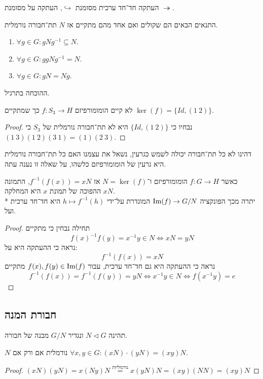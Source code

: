 \begin{notation}
	העתקה חד־חד ערכית מסומנת $\hookrightarrow$,
	העתקה על מסומנת $\twoheadrightarrow$.
\end{notation}
\begin{proposition}
	התנאים הבאים הם שקולים ואם אחד מהם מתקיים אז $N$ תת־חבורה נורמלית.
	\begin{enumerate}
		\item $\forall g \in G : g N g^{-1} \subseteq N$.
		\item $\forall g \in G : g g N g^{-1} = N$.
		\item $\forall g \in G : g N = N g$.
	\end{enumerate}
	ההוכחה בתרגיל.
\end{proposition}
\begin{conclusion}
	לא קיים הומומורפיזם $f : S_3 \to H$ כך שמתקיים $\ker(f) = \{ Id, (1\ 2) \}$.
\end{conclusion}
\begin{proof}
	נבחיו כי $\{ Id, (1\ 2)\}$ היא לא תת־חבורה נורמלית של $S_3$ כי $(1\ 3)(1\ 2)(3\ 1) = (1)(2\ 3)$.
\end{proof}
דהינו לא כל תת־חבורה יכולה לשמש כגרעין, נשאל את עצמנו האם כל תת־חבורה נורמלית היא גרעין של הומומורפיזם כלשהו, על שאלה זו נענה עתה.

\begin{proposition}
	כאשר $f : G \to H$ הומומורפיזם ו־$N = \ker(f)$ אז $f^{-1}(f(x)) = x N$, התמונה ההפוכה של תמונת $x$ היא המחלקה $x N$. \\*
	יתרה מכך הפונקציה $\operatorname{Im}(f) \to G/N$ המוגדרת על־ידי $h \mapsto f^{-1}(h)$ היא חד־חד ערכית ועל.
\end{proposition}
\begin{proof}
	תחילה נבחין כי מתקיים
	\[
		{f(x)}^{-1} f(y) = x^{-1} y \in N \iff xN = yN
	\]
	נראה כי ההעתקה היא על:
	\[
		f^{-1}(f(x)) = xN
	\]
	נראה כי ההעתקה היא גם חד־חד ערכית,
	עבור $f(x), f(y) \in \operatorname{Im}(f)$ מתקיים
	\[
		f^{-1}(f(x)) = f^{-1}(f(y)) = yN
		\iff
		x^{-1} y \in N
		\iff
		f(x^{-1} y) = e
	\]
\end{proof}

\subsection{חבורת המנה}
תהינה $N \triangleleft G$ ונגדיר $G/N$ מבנה של חבורה.

\begin{proposition}
	$N$ נורמלית אם ורק אם $\forall x, y \in G : (xN) \cdot (yN) = (xy)N$.
\end{proposition}
\begin{proof}
	$(x N)(y N) = x (Ny) N \overset{\text{נורמליות}}{=} x (yN) N = (xy)(NN) = (xy)N$
\end{proof}

